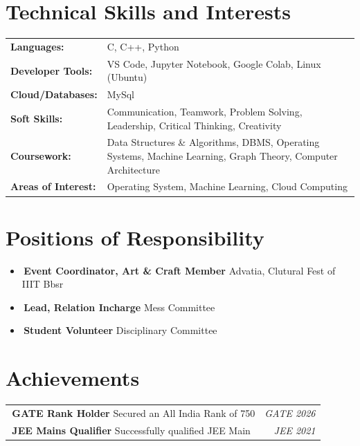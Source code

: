 \documentclass[10pt,a4paper]{article}
\newcommand{\bulletitem}{\textbullet\,}
\begin{document}
\section{Technical Skills and Interests}
\begin{tabularx}{\linewidth}{@{}>{\bfseries}l@{\hspace{3pt}}X@{}}
Languages: & C, C++, Python\\
Developer Tools: & VS Code, Jupyter Notebook, Google Colab, Linux (Ubuntu)\\
Cloud/Databases: & MySql\\
Soft Skills: & Communication, Teamwork, Problem Solving, Leadership, Critical Thinking, Creativity\\
Coursework: & Data Structures \& Algorithms, DBMS, Operating Systems, Machine Learning, Graph Theory, Computer Architecture\\
Areas of Interest: & Operating System, Machine Learning, Cloud Computing
\end{tabularx}

\section{Positions of Responsibility}
\begin{itemize}[leftmargin=0pt,label={},itemsep=4pt,topsep=0pt,parsep=0pt]
    \item \textbf{\bulletitem Event Coordinator, Art \& Craft Member} Advatia, Clutural Fest of IIIT Bbsr
    \item \textbf{\bulletitem Lead, Relation Incharge} Mess Committee
    \item \textbf{\bulletitem Student Volunteer} Disciplinary Committee
\end{itemize}

\section{Achievements}
\begin{tabularx}{\linewidth}{@{}Xr@{}}
\textbf{\bulletitem GATE Rank Holder} \quad Secured an All India Rank of 750 & \textit{GATE 2026}\\[4pt]
\textbf{\bulletitem JEE Mains Qualifier} \quad Successfully qualified JEE Main & \textit{JEE 2021}
\end{tabularx}
\end{document}
